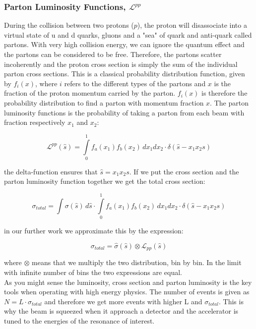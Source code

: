 \subsubsection{Parton Luminosity Functions, $\mathcal{L}^{pp}$}
During the collision between two protons ($p$), the proton will disassociate into a virtual state of u and d quarks, gluons and a "sea" of quark and anti-quark called partons. With very high collision energy, we can ignore the quantum effect and the partons can be considered to be free. Therefore, the partons scatter incoherently and the proton cross section is simply the sum of the individual parton cross sections. This is a classical probability distribution function, given by $f_{i}(x)$, where $i$ refers to the different types of the partons and $x$ is the fraction of the proton momentum carried by the parton\cite{green2005hpp}. $f_{i}(x)$ is therefore the probability distribution to find a parton with momentum fraction $x$. The parton luminosity functions is the probability of taking a parton from each beam with fraction respectively $x_{1}$ and $x_{2}$:

\begin{equation}
\mathcal{L}^{pp}(\hat s)=\int\limits_{0}^{1} f_{a}(x_{1}) f_{b}(x_{2})\, dx_{1}dx_{2}\cdot \delta(\hat s - x_{1}x_{2}s)
\end{equation}

the delta-function ensures that $\hat s = x_{1}x_{2}s$. If we put the cross section and the parton luminosity function together we get the total cross section:

\begin{equation}
\sigma_{total}=\int \sigma(\hat s) \, d \hat s \cdot \int\limits_{0}^{1} f_{a}(x_{1}) f_{b}(x_{2})\, dx_{1}dx_{2} \cdot \delta(\hat s - x_{1}x_{2}s)
\end{equation}

in our further work we approximate this by the expression:

\begin{equation}
\sigma_{total}= \hat \sigma(\hat s) \otimes  \mathcal{L}_{pp}(\hat s)
\end{equation}

where $\otimes$ means that we multiply the two distribution, bin by bin. In the limit with infinite number of bins the two expressions are equal. \\

As you might sense the luminosity, cross section and parton luminosity is the key tools when operating with high energy physics. The number of events is given as $N=L\cdot\sigma_{total}$ and therefore we get more events with higher L and $\sigma_{total}$. This is why the beam is squeezed when it approach a detector and the accelerator is tuned to the energies of the resonance of interest.

